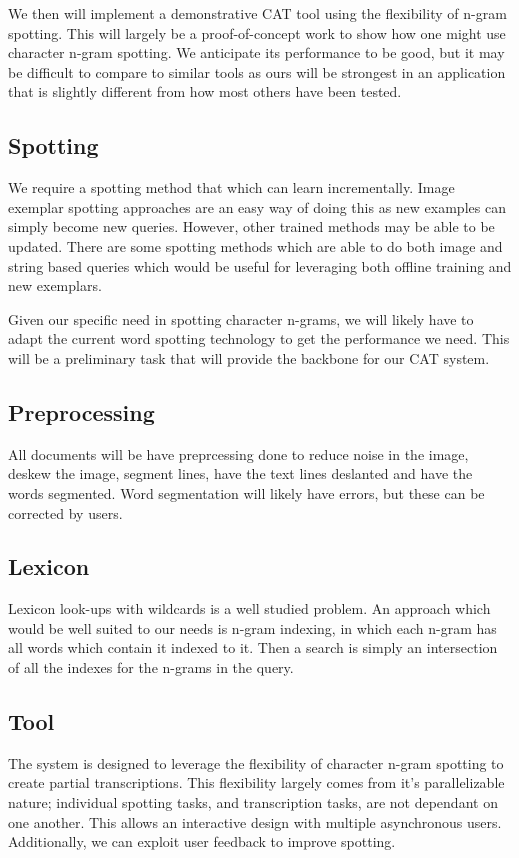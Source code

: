\documentclass[ms]{byuprop}
\begin{document}
We then will implement a demonstrative CAT tool using the flexibility of n-gram spotting. This will largely be a proof-of-concept work to show how one might use character n-gram spotting. We anticipate its performance to be good, but it may be difficult to compare to similar tools as ours will be strongest in an application that is slightly different from how most others have been tested.


\subsection{Spotting}
We require a spotting method that which can learn incrementally. Image exemplar spotting approaches are an easy way of doing this as new examples can simply become new queries. However, other trained methods may be able to be updated. There are some spotting methods which are able to do both image and string based queries\cite{Almazan2014} which would be useful for leveraging both offline training and new exemplars.

Given our specific need in spotting character n-grams, we will likely have to adapt the current word spotting technology to get the performance we need. This will be a preliminary task that will provide the backbone for our CAT system.

\subsection{Preprocessing}
All documents will be have preprcessing done to reduce noise in the image, deskew the image, segment lines, have the text lines deslanted and have the words segmented. Word segmentation will likely have errors, but these can be corrected by users.

\subsection{Lexicon}
Lexicon look-ups with wildcards is a well studied problem. An approach which would be well suited to our needs is n-gram indexing, in which each n-gram has all words which contain it indexed to it. Then a search is simply an intersection of all the indexes for the n-grams in the query.

\subsection{Tool}
The system is designed to leverage the flexibility of character n-gram spotting to create partial transcriptions. This flexibility largely comes from it's parallelizable nature; individual spotting tasks, and transcription tasks, are not dependant on one another. This allows an interactive design with multiple asynchronous users. Additionally, we can exploit user feedback to improve spotting.
\end{document}
